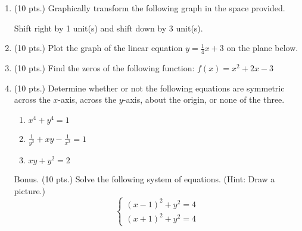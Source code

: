 \documentclass{article}
\begin{document}
\begin{enumerate}
\item (10 pts.) Graphically transform the following graph in the space provided.

\begin{center}
Shift right by 1 unit(s) and shift down by 3 unit(s).
\end{center}

\begin{center}
\MiniGraph[gadget=cubic]
\end{center}

   \vspace{1cm}

\newpage

\item (10 pts.) Plot the graph of the linear equation $y = \frac{1}{4} x + 3$ on the plane below.\begin{center}
\CartesianPlane[h=7,w=7,axes=yes]
\end{center}

  

\item (10 pts.) Find the zeros of the following function: $f(x) = x^2 + 2x - 3$ \vspace{3cm}

\item (10 pts.) Determine whether or not the following equations are symmetric across the $x$-axis, across the $y$-axis, about the origin, or none of the three.

\begin{enumerate}
\item $x^4 + y^4 = 1$ \vspace{3cm}
\item $\displaystyle\frac{1}{y^2} + xy - \displaystyle\frac{1}{x^2} = 1$ \vspace{3cm}
\item $xy + y^2 = 2$ \vspace{3cm}
\end{enumerate}

 \vspace{1cm}

\newpage

\item[Bonus.] (10 pts.) Solve the following system of equations. (Hint: Draw a picture.) \[ \left\{ \begin{array}{l} (x-1)^2 + y^2 = 4 \\ (x+1)^2 + y^2 = 4 \end{array} \right. \]

\end{enumerate}
\end{document}
